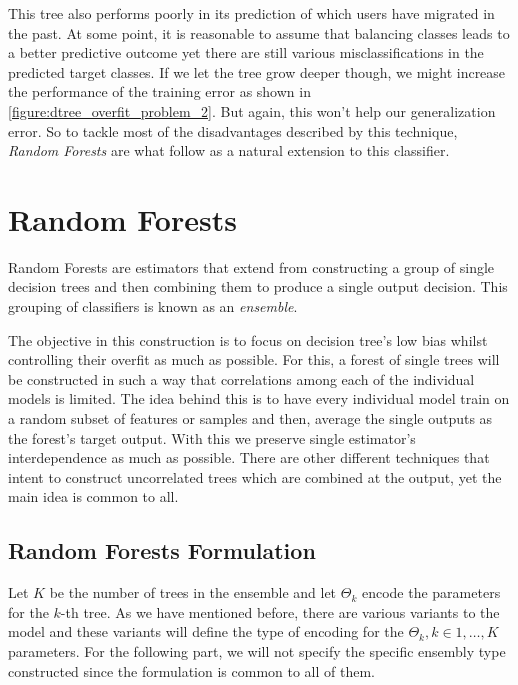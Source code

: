 This tree also performs poorly in its prediction of which users have migrated in the past.
At some point, it is reasonable to assume that balancing classes leads to a better predictive outcome yet there are still various misclassifications in the predicted target classes.
If we let the tree grow deeper though, we might increase the performance of the training error as shown in \cref{figure:dtree_overfit_problem_2}.
But again, this won't help our generalization error.
So to tackle most of the disadvantages described by this technique, \textit{Random Forests} are what follow as a natural extension to this classifier.


\section{ Random Forests}\label{section:random_forests}

Random Forests are estimators that extend from constructing a group of single decision trees and then combining them to produce a single output decision.
This grouping of classifiers is known as an \textit{ensemble}.

The objective in this construction is to focus on decision tree's low bias whilst controlling their overfit as much as possible.
For this, a forest of single trees will be constructed in such a way that correlations among each of the individual models is limited.
The idea behind this is to have every individual model train on a random subset of features or samples and then, average the single outputs as the forest's target output.
With this we preserve single estimator's interdependence as much as possible.
There are other different techniques that intent to construct uncorrelated trees which are combined at the output, yet the main idea is common to all.

\subsection{ Random Forests Formulation}\label{subsection:random_forests_formulation}

Let $K$ be the number of trees in the ensemble and let $\Theta_k$ encode the parameters for the $k$-th tree.
As we have mentioned before, there are various variants to the model and these variants will define the type of encoding for the $\Theta_k, k \in {1,\ldots,K}$  parameters.
For the following part, we will not specify the specific ensembly type constructed since the formulation is common to all of them.


